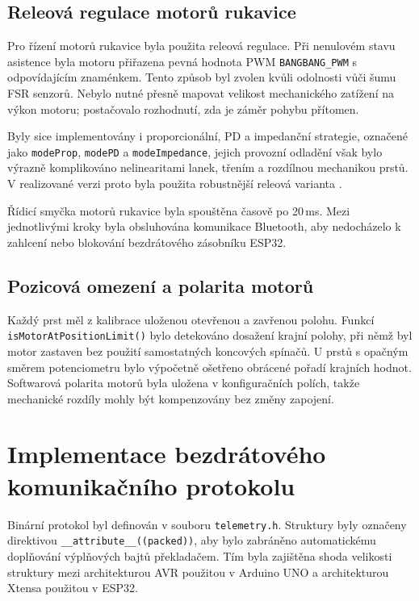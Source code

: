 \subsection{Releová regulace motorů rukavice}
\label{subsec:releova-regulace}

Pro řízení motorů rukavice byla použita releová regulace. Při nenulovém stavu asistence byla motoru přiřazena pevná hodnota PWM \texttt{BANGBANG\_PWM} s odpovídajícím znaménkem. Tento způsob byl zvolen kvůli odolnosti vůči šumu FSR senzorů. Nebylo nutné přesně mapovat velikost mechanického zatížení na výkon motoru; postačovalo rozhodnutí, zda je záměr pohybu přítomen.

Byly sice implementovány i proporcionální, PD a impedanční strategie, označené jako \texttt{modeProp}, \texttt{modePD} a \texttt{modeImpedance}, jejich provozní odladění však bylo výrazně komplikováno nelinearitami lanek, třením a rozdílnou mechanikou prstů. V realizované verzi proto byla použita robustnější releová varianta \cite{GIUDICI2025}.

Řídicí smyčka motorů rukavice byla spouštěna časově po 20\,ms. Mezi jednotlivými kroky byla obsluhována komunikace Bluetooth, aby nedocházelo k zahlcení nebo blokování bezdrátového zásobníku ESP32.

\subsection{Pozicová omezení a polarita motorů}
\label{subsec:pozicova-omezeni}

Každý prst měl z kalibrace uloženou otevřenou a zavřenou polohu. Funkcí \texttt{isMotorAtPositionLimit()} bylo detekováno dosažení krajní polohy, při němž byl motor zastaven bez použití samostatných koncových spínačů. U prstů s opačným směrem potenciometru bylo výpočetně ošetřeno obrácené pořadí krajních hodnot. Softwarová polarita motorů byla uložena v konfiguračních polích, takže mechanické rozdíly mohly být kompenzovány bez změny zapojení.

\section{Implementace bezdrátového komunikačního protokolu}
\label{sec:implementace-bt-protokolu}

Binární protokol byl definován v souboru \texttt{telemetry.h}. Struktury byly označeny direktivou \texttt{\_\_attribute\_\_((packed))}, aby bylo zabráněno automatickému doplňování výplňových bajtů překladačem. Tím byla zajištěna shoda velikosti struktury mezi architekturou AVR použitou v Arduino UNO a architekturou Xtensa použitou v ESP32.

